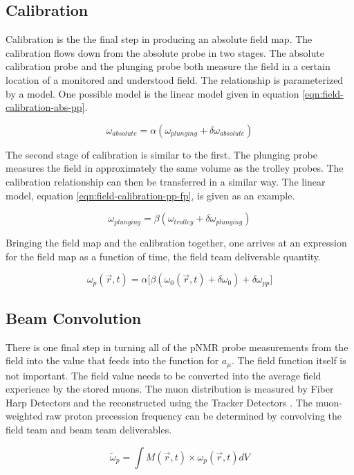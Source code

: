 \subsection{Calibration}

Calibration is the the final step in producing an absolute field map.  The calibration flows down from the absolute probe in two stages.  The absolute calibration probe and the plunging probe both measure the field in a certain location of a monitored and understood field.  The relationship is parameterized by a model.  One possible model is the linear model given in equation \ref{eqn:field-calibration-abs-pp}.

\begin{equation}
\label{eqn:field-calibration-abs-pp}
\omega_{absolute} = \alpha(\omega_{plunging} + \delta \omega_{absolute})
\end{equation}

The second stage of calibration is similar to the first.  The plunging probe measures the field in approximately the same volume as the trolley probes.  The calibration relationship can then be transferred in a similar way.  The linear model, equation \ref{eqn:field-calibration-pp-fp}, is given as an example.

\begin{equation}
\label{eqn:field-calibration-pp-fp}
\omega_{plunging} = \beta(\omega_{trolley} + \delta \omega_{plunging})
\end{equation}

Bringing the field map and the calibration together, one arrives at an expression for the field map as a function of time, the field team deliverable quantity.

\begin{equation}
\label{eqn:field-omega-p}
\omega_p(\vec{r}, t) = \alpha 
\Big [ 
\beta (\omega_0(\vec{r}, t) + \delta \omega_0) + \delta \omega_{pp}
\Big ]
\end{equation}

\subsection{Beam Convolution}

There is one final step in turning all of the pNMR probe measurements from the field into the value that feeds into the function for $a_\mu$.  The field function itself is not important.  The field value needs to be converted into the average field experience by the stored muons.  The muon distribution is measured by Fiber Harp Detectors and the reconstructed using the Tracker Detectors \cite{e989-tdr}.  The muon-weighted raw proton precession frequency can be determined by convolving the field team and beam team deliverables.

\begin{equation}
\label{eqn:field-omega-p-tilde}
\tilde{\omega}_p = \int M(\vec{r}, t) \times \omega_p(\vec{r}, t) dV
\end{equation}
